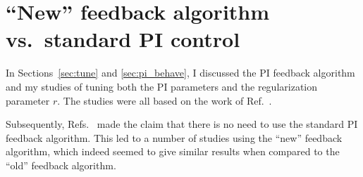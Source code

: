 


\section{``New'' feedback algorithm vs.~standard PI control}\label{sec:style_pi}


In Sections~\ref{sec:tune} and \ref{sec:pi_behave}, I discussed the PI
feedback algorithm and my studies of tuning both the PI parameters and
the regularization parameter $r$. The studies were all based on the
work of Ref.~\cite{bea}.

Subsequently, Refs.~\cite{rawlik,rawkliknedm2017,rawlikpriv} made the
claim that there is no need to use the standard PI feedback algorithm.
This led to a number of studies using the ``new'' feedback algorithm,
which indeed seemed to give similar results when compared to the
``old'' feedback algorithm.

